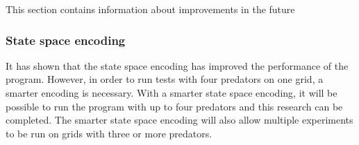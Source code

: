 This section contains information about improvements in the future

\subsubsection{State space encoding}
It has shown that the state space encoding has improved the performance of the program. However, in order to run tests with four predators on one grid, a smarter encoding is necessary. With a smarter state space encoding, it will be possible to run the program with up to four predators and this research can be completed. The smarter state space encoding will also allow multiple experiments to be run on grids with three or more predators. 